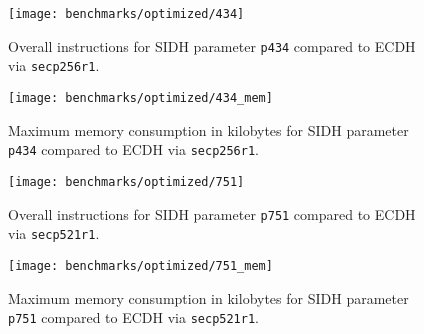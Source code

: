 \begin{figure}[H]
  \centering
  \texttt{[image: benchmarks/optimized/434]}
  \caption[Overall instructions p434]
  {Overall instructions for SIDH parameter \texttt{p434} compared to ECDH via \texttt{secp256r1}.}
  \label{fig:results_opt_434}
\end{figure}

\begin{figure}[H]
  \centering
  \texttt{[image: benchmarks/optimized/434\_mem]}
  \caption[Maximum memory consumption p434]
  {Maximum memory consumption in kilobytes for SIDH parameter \texttt{p434} compared to ECDH via \texttt{secp256r1}.}
  \label{fig:results_opt_434_mem}
\end{figure}

\begin{figure}[H]
  \centering
  \texttt{[image: benchmarks/optimized/751]}
  \caption[Overall instructions p751]
  {Overall instructions for SIDH parameter \texttt{p751} compared to ECDH via \texttt{secp521r1}.}
  \label{fig:results_opt_751}
\end{figure}

\begin{figure}[H]
  \centering
  \texttt{[image: benchmarks/optimized/751\_mem]}
  \caption[Maximum memory consumption 751]
  {Maximum memory consumption in kilobytes for SIDH parameter \texttt{p751} compared to ECDH via \texttt{secp521r1}.}
  \label{fig:results_opt_751_mem}
\end{figure}

